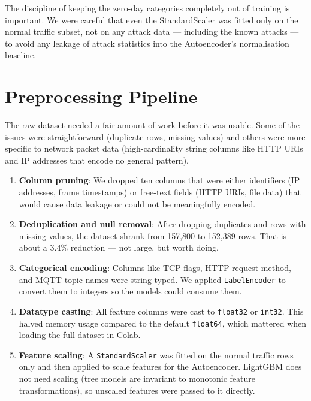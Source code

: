 \documentclass[12pt,a4paper]{report}
\begin{document}
\noindent The discipline of keeping the zero-day categories completely out of
training is important. We were careful that even the StandardScaler was fitted
only on the normal traffic subset, not on any attack data — including the known
attacks — to avoid any leakage of attack statistics into the Autoencoder's
normalisation baseline.

\section{Preprocessing Pipeline}

The raw dataset needed a fair amount of work before it was usable. Some of the
issues were straightforward (duplicate rows, missing values) and others were
more specific to network packet data (high-cardinality string columns like HTTP
URIs and IP addresses that encode no general pattern).

\begin{enumerate}
  \item \textbf{Column pruning}: We dropped ten columns that were either
        identifiers (IP addresses, frame timestamps) or free-text fields
        (HTTP URIs, file data) that would cause data leakage or could not be
        meaningfully encoded.
  \item \textbf{Deduplication and null removal}: After dropping duplicates and
        rows with missing values, the dataset shrank from 157,800 to 152,389
        rows. That is about a 3.4\% reduction — not large, but worth doing.
  \item \textbf{Categorical encoding}: Columns like TCP flags, HTTP request
        method, and MQTT topic names were string-typed. We applied
        \texttt{LabelEncoder} to convert them to integers so the models could
        consume them.
  \item \textbf{Datatype casting}: All feature columns were cast to
        \texttt{float32} or \texttt{int32}. This halved memory usage compared
        to the default \texttt{float64}, which mattered when loading the full
        dataset in Colab.
  \item \textbf{Feature scaling}: A \texttt{StandardScaler} was fitted on the
        normal traffic rows only and then applied to scale features for the
        Autoencoder. LightGBM does not need scaling (tree models are invariant
        to monotonic feature transformations), so unscaled features were passed
        to it directly.
\end{enumerate}
\end{document}

